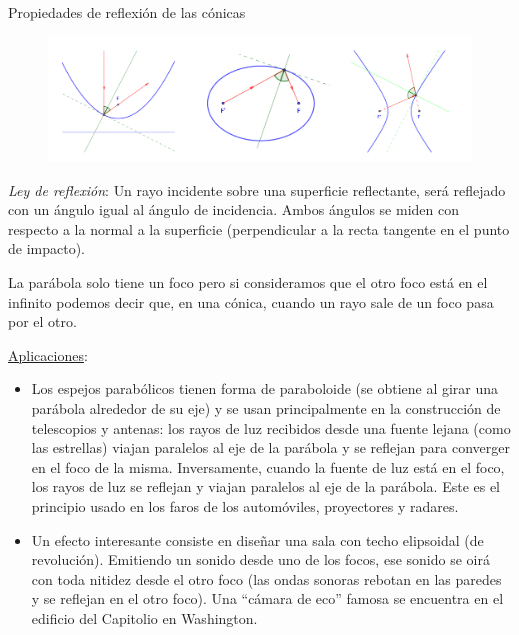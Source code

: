 \vspace{5mm}
\begin{myalertblock}{Propiedades de reflexión de las cónicas}

\begin{figure}[H]
	\centering
	\includegraphics[width=1\textwidth]{img-conicas/conicas15.png}
	\end{figure}
	

\emph{Ley de reflexión}: \textsf{Un rayo incidente sobre una superficie reflectante, será reflejado con un ángulo igual al ángulo de incidencia. Ambos ángulos se miden con respecto a la normal a la superficie (perpendicular a la recta tangente en el punto de impacto)}.



La parábola solo tiene un foco pero si consideramos que el otro foco está en el infinito podemos decir que, en una cónica, cuando un rayo sale de un foco pasa por el otro.

\underline{Aplicaciones}:

\begin{itemize}
\item Los espejos parabólicos tienen forma de paraboloide (se obtiene al girar una parábola alrededor de su eje) y se usan principalmente en la construcción de telescopios y antenas: los rayos de luz recibidos desde una fuente lejana (como las estrellas) viajan paralelos al eje de la parábola y se reflejan para converger en el foco de la misma. Inversamente, cuando la fuente de luz está en el foco, los rayos de luz se reflejan y viajan paralelos al eje de la parábola. Este es el principio usado en los faros de los automóviles, proyectores y radares.

\item Un efecto interesante consiste en diseñar una sala con techo elipsoidal (de revolución). Emitiendo un sonido desde uno de los focos, ese sonido se oirá con toda nitidez desde el otro foco (las ondas sonoras rebotan en las paredes y se reflejan en el otro foco). Una ``cámara de eco'' famosa se encuentra en el edificio del Capitolio en Washington. 


\end{itemize}
\end{myalertblock}
